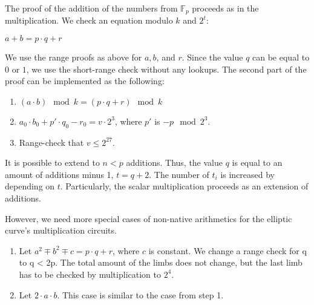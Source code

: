 The proof of the addition of the numbers from $\mathbb{F}_p$ proceeds as in the multiplication.
We check an equation modulo $k$ and $2^t$:
\begin{center}
$a + b = p\cdot q + r$
\end{center}
We use the range proofs as above for $a, b$, and $r$.
Since the value $q$ can be equal to $0$ or $1$, we use the short-range check without any lookups.
The second part of the proof can be implemented as the following:
\begin{enumerate}
\item $(a\cdot b) \mod k = (p \cdot q + r) \mod k$
\item $a_0 \cdot b_0 + p'\cdot q_0 - r_0 = v \cdot 2^3$, where $p'$ is $- p \mod 2^3$.
\item Range-check that $v \leq 2^{27}$.
\end{enumerate} 
It is possible to extend to $n < p$ additions.
Thus, the value $q$ is equal to an amount of additions minus 1, $t = q + 2$.
The number of $t_i $ is increased by depending on $t$.
Particularly, the scalar multiplication proceeds as an extension of additions.

However, we need more special cases of non-native arithmetics for the elliptic curve's multiplication circuits.
\begin{enumerate}
\item Let $a^2 \mp b^2 \mp c = p \cdot q + r$, where $c$ is constant. 
We change a range check for q to q < 2p.
The total amount of the limbs does not change, but the last limb has to be checked by multiplication to $2^4$.
\item Let $2 \cdot a \cdot b$.
This case is similar to the case from step 1.
\end{enumerate}

